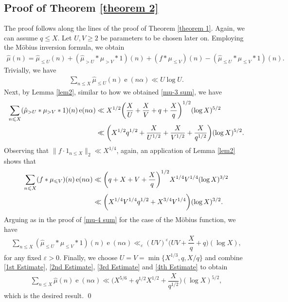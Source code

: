 \documentclass[11pt]{amsart}
\numberwithin{equation}{section}
\numberwithin{figure}{section}
\theoremstyle{definition}
\newcommand{\e}{\operatorname{e}}
\begin{document}
\subsection{Proof of Theorem \ref{theorem 2}}
The proof follows along the lines of the proof of Theorem \ref{theorem 1}. Again,  we can assume $q \leqslant X$. Let $U, V \geqslant 2$ be parameters to be chosen later on. Employing the Möbius inversion formula, we obtain
\begin{align*}
    \hat{\mu}(n)=\hat{\mu}_{ \leqslant U}(n) + (\hat{\mu}_{ > U}*\mu_{>V}*1)(n) + (f*\mu_{\leqslant V})(n) - (\hat{\mu}_{ \leqslant U}*\mu_{\leqslant V}*1)(n).
\end{align*}
Trivially, we have
\begin{align}\label{1st Estimate}
    \sum_{n\leqslant X }\hat{\mu}_{ \leqslant U}(n)\e(n\alpha) \ll  U \log U.
\end{align}
Next, by Lemma \ref{lem2}, similar to how we obtained \eqref{mu-3 sum}, we have
\begin{align}\label{2nd Estimate}
\sum_{n\leqslant X } (\hat{\mu}_{ > U}*\mu_{>V}*1)(n)\e(n\alpha) &\ll  X^{1/2}\bigg(\dfrac{X}{U}+\dfrac{X}{V}+q + \dfrac{X}{q} \bigg)^{1/2} (\log X)^{5/2}\notag \\
&\ll \bigg(X^{1/2}q^{1/2}+\dfrac{X}{U^{1/2}}+\dfrac{X}{V^{1/2}}  + \dfrac{X}{q^{1/2}}\bigg)(\log X)^{5/2}.
\end{align}
Observing that $\|f \cdot 1_{n\leqslant X} \|_2 \ll X^{1/4}$, again, an application of Lemma \ref{lem2} shows that
\begin{align}\label{3rd Estimate}
\sum_{n\leqslant X }(f*\mu_{\leqslant V})(n)\e(n\alpha) &\ll \bigg(q + X + V + \dfrac{X}{q}\bigg)^{1/2}X^{1/4}V^{1/4}(\log X)^{3/2}\notag \\
&\ll \bigg(X^{1/4}V^{1/4}q^{1/2}+X^{3/4}V^{1/4}\bigg)(\log X)^{3/2}.
\end{align}
Arguing as in the proof of \eqref{mu-4 sum} for the case of the M\"{o}bius function, we have
\begin{align}\label{4th Estimate}
\sum_{n\leqslant X }(\hat{\mu}_{ \leqslant U}*\mu_{\leqslant V}*1)(n)\e(n\alpha) \ll_{\varepsilon} (UV)^{\varepsilon}\bigg( UV+ \dfrac{X}{q} + q\bigg)(\log X),
\end{align}
for any fixed $\varepsilon>0$. Finally, we choose $U=V=\min\{ X^{1/3}, q, X/q \}$ and combine \eqref{1st Estimate}, \eqref{2nd Estimate}, \eqref{3rd Estimate} and \eqref{4th Estimate} to obtain
\begin{align*}
\sum_{n\leqslant X }\hat{\mu}(n)\e(n\alpha) \ll \bigg(X^{5/6} + q^{1/2}X^{1/2} + \dfrac{X}{q^{1/2}}\bigg)(\log X)^{5/2},
\end{align*}
which is the desired result. \qed
\end{document}
